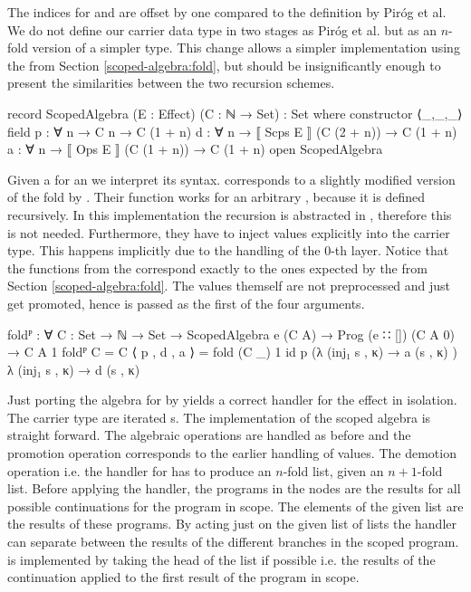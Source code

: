 The indices for  and  are offset by one compared to
the definition by Piróg et al.
We do not define our carrier data type in two stages as Piróg et al. but as an
$n$-fold version of a simpler type.
This change allows a simpler implementation using the  from
Section \ref{scoped-algebra:fold}, but should be insignificantly enough to
present the similarities between the two recursion schemes.

\begin{code}
record ScopedAlgebra (E : Effect) (C : ℕ → Set) : Set where
  constructor ⟨_,_,_⟩
  field
    p : ∀ {n} → C n                      → C (1 + n)
    d : ∀ {n} → ⟦ Scps  E ⟧ (C (2 + n))  → C (1 + n)
    a : ∀ {n} → ⟦ Ops   E ⟧ (C (1 + n))  → C (1 + n)
open ScopedAlgebra
\end{code}
Given a  for an  we
interpret its syntax.
 corresponds to a slightly modified version of the fold by
\textcite{DBLP:conf/lics/PirogSWJ18}.
Their function works for an arbitrary , because it is defined
recursively. 
In this implementation the recursion is abstracted in ,
therefore this is not needed.
Furthermore, they have to inject values explicitly into the carrier type.
This happens implicitly due to the handling of the $0$-th layer.
Notice that the functions from the  correspond
exactly to the ones expected by the  from Section
\ref{scoped-algebra:fold}.
The values themself are not preprocessed and just get promoted, hence
 is passed as the first of the four arguments.

\begin{code}
foldᴾ : ∀ {C : Set → ℕ → Set} → ScopedAlgebra e (C A) → 
  Prog (e ∷ []) (C A 0) → C A 1
foldᴾ {C = C} ⟨ p , d , a ⟩ = fold (C _) 1 id p
  (λ{ (inj₁ s , κ) → a (s , κ) }) λ{ (inj₁ s , κ) → d (s , κ) }
\end{code}
Just porting the algebra for  by
\textcite{DBLP:conf/lics/PirogSWJ18} yields a
correct handler for the effect in isolation.
The carrier type are iterated s.
The implementation of the scoped algebra is straight forward.
The algebraic operations are handled as before and the promotion operation
corresponds to the earlier handling of values.
The demotion operation i.e. the handler for  has
to produce an $n$-fold list, given an $n+1$-fold list.
Before applying the handler, the programs in the 
nodes are the results for all possible continuations for the program in scope.
The elements of the given list are the results of these programs.
By acting just on the given list of lists the handler can separate between the
results of the different branches in the scoped program.
 is implemented by taking the head of the list if possible
i.e. the results of the continuation applied to the first result of the program
in scope.

